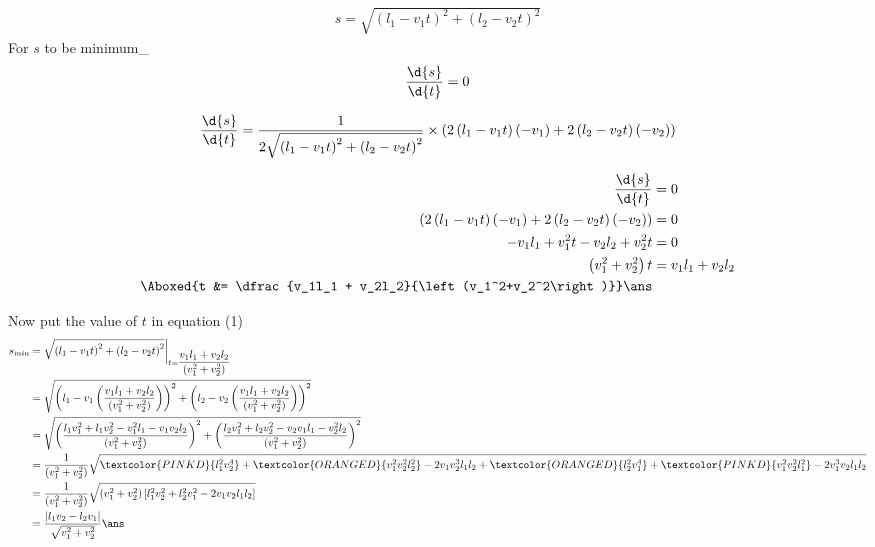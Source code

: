 \documentclass{article}
\begin{document}
\addtolength{\jot}{3ex}
\begin{align}
s = \sqrt{\left(l_1-v_1t\right)^2 + \left(l_2-v_2t\right)^2} 
\end{align}
For $s$ to be minimum\_ 
\begin{align*}
\dfrac{\d{s}}{\d{t}} = 0
\end{align*}

\pagebreak
\begin{align*}
\dfrac{\d{s}}{\d{t}} &= \dfrac{1}{2\sqrt{\left(l_1-v_1t\right)^2 + \left(l_2-v_2t\right)^2}} \times \left(2\left(l_1-v_1t\right)\left(-v_1\right) + 2\left(l_2-v_2t\right)\left(-v_2\right) \right)  \\
\end{align*}

\begin{align*}
\dfrac{\d{s}}{\d{t}} &= 0 \\
\left(2\left(l_1-v_1t\right)\left(-v_1\right) + 2\left(l_2-v_2t\right)\left(-v_2\right) \right) &= 0 \\
-v_1l_1 + v_1^2t - v_2l_2 + v_2^2t &= 0\\
\left(v_1^2+v_2^2\right)t &= v_1l_1 + v_2l_2\\
\Aboxed{t &= \dfrac{v_1l_1 + v_2l_2}{\left(v_1^2+v_2^2\right)}} \ans
\end{align*}

\pagebreak
Now put the value of $t$ in equation (1)
\begin{align*}
s_{\textit{min}} &= \sqrt{\left(l_1-v_1t\right)^2 + \left(l_2-v_2t\right)^2} \bigg\rvert_{t=\dfrac{v_1l_1 + v_2l_2}{\left(v_1^2+v_2^2\right)}}\\
 &= \sqrt{\left( l_1 -v_1 \left( \dfrac{v_1l_1 + v_2l_2}{\left(v_1^2+v_2^2\right)} \right) \right)^2 + \left( l_2 -v_2 \left( \dfrac{v_1l_1 + v_2l_2}{\left(v_1^2+v_2^2\right)} \right) \right)^2 }\\
 &= \sqrt{\left( \dfrac{ l_1v_1^2 + l_1v_2^2 -v_1^2l_1 -v_1 v_2l_2}{\left(v_1^2+v_2^2\right)} \right)^2 + \left( \dfrac{ l_2v_1^2 + l_2v_2^2 -v_2v_1l_1 - v_2^2l_2}{\left(v_1^2+v_2^2\right)} \right)^2 }\\
 &= \dfrac{1}{\left( v_1^2 + v_2^2\right)}\sqrt{\textcolor{PINKD}{l_1^2v_2^4} + \textcolor{ORANGED}{v_1^2v_2^2l_2^2} - 2v_1v_2^3l_1l_2 + \textcolor{ORANGED}{l_2^2v_1^4} + \textcolor{PINKD}{v_1^2v_2^2l_1^2} - 2v_1^3v_2l_1l_2}\\
 &= \dfrac{1}{\left( v_1^2 + v_2^2\right)} \sqrt{\left(v_1^2+v_2^2\right)\left[ l_1^2v_2^2 + l_2^2v_1^2-2v_1v_2l_1l_2\right]}\\
 &= \dfrac{\left| l_1v_2-l_2v_1 \right|}{\sqrt{v_1^2+v_2^2}} \ans
\end{align*}
\pagebreak
\end{document}
